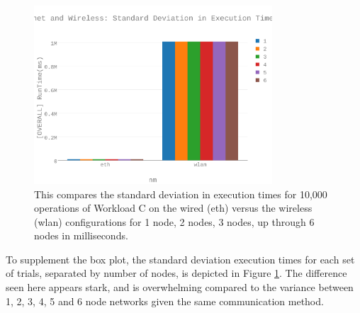 \begin{figure}[h]
\includegraphics[width=3.5in]{Figures/figures-wle_fig9.pdf}

\caption{This compares the standard deviation in execution times for 10,000 operations of Workload C on the wired (eth) versus the wireless (wlan) configurations for 1 node, 2 nodes, 3 nodes, up through 6 nodes in milliseconds.}

\label{fig:fig09}
\end{figure}

To supplement the box plot, the standard deviation execution times for each set of trials, separated by number of nodes, is depicted in Figure \ref{fig:fig09}.  The difference seen here appears stark, and is overwhelming compared to the variance between 1, 2, 3, 4, 5 and 6 node networks given the same communication method. 

